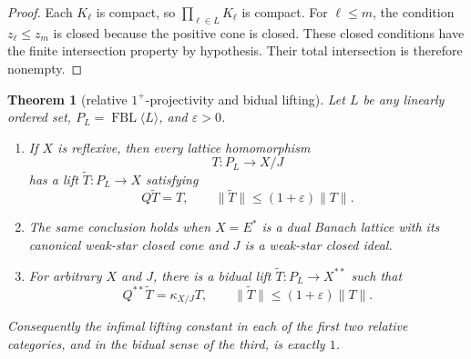 \documentclass[11pt]{article}
\newtheorem{theorem}{Theorem}
\newcommand{\FBL}{\operatorname{FBL}}
\begin{document}
\begin{proof}
Each \(K_\ell\) is compact, so \(\prod_{\ell\in L}K_\ell\) is compact.
For \(\ell\le m\), the condition \(z_\ell\le z_m\) is closed because the
positive cone is closed.  These closed conditions have the finite
intersection property by hypothesis.  Their total intersection is
therefore nonempty.
\end{proof}

\begin{theorem}[relative \(1^+\)-projectivity and bidual lifting]
\label{thm:main}
Let \(L\) be any linearly ordered set, \(P_L=\FBL\langle L\rangle\), and
\(\varepsilon>0\).
\begin{enumerate}
 \item If \(X\) is reflexive, then every lattice homomorphism
 \[
 T:P_L\longrightarrow X/J
 \]
 has a lift \(\widetilde T:P_L\to X\) satisfying
 \[
 Q\widetilde T=T,\qquad
 \|\widetilde T\|\le(1+\varepsilon)\|T\|.
 \]
 \item The same conclusion holds when \(X=E^*\) is a dual Banach lattice
 with its canonical weak-star closed cone and \(J\) is a weak-star closed
 ideal.
 \item For arbitrary \(X\) and \(J\), there is a bidual lift
 \(\widetilde T:P_L\to X^{**}\) such that
 \[
 Q^{**}\widetilde T=\kappa_{X/J}T,\qquad
 \|\widetilde T\|\le(1+\varepsilon)\|T\|.
 \]
\end{enumerate}
Consequently the infimal lifting constant in each of the first two
relative categories, and in the bidual sense of the third, is exactly
\(1\).
\end{theorem}
\end{document}
